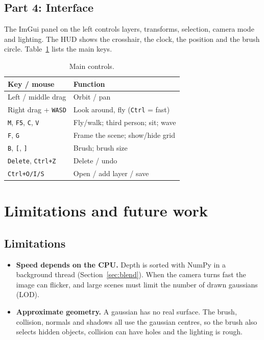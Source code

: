 \documentclass[9pt,twocolumn,a4paper]{extarticle}
\newcommand{\code}[1]{\texttt{#1}}
\begin{document}
\subsection{Part 4: Interface}
The ImGui panel on the left controls layers, transforms, selection, camera mode and lighting. The HUD shows the crosshair, the clock, the position and the brush circle. Table~\ref{tab:keys} lists the main keys.
\begin{table}[H]
\centering
\caption{Main controls.}
\label{tab:keys}
\footnotesize
\begin{tabular}{@{}p{3.1cm}p{4.6cm}@{}}
\toprule
Key / mouse & Function \\
\midrule
Left / middle drag & Orbit / pan \\
Right drag + \code{WASD} & Look around, fly (\code{Ctrl} = fast) \\
\code{M}, \code{F5}, \code{C}, \code{V} & Fly/walk; third person; sit; wave \\
\code{F}, \code{G} & Frame the scene; show/hide grid \\
\code{B}, \code{[}, \code{]} & Brush; brush size \\
\code{Delete}, \code{Ctrl+Z} & Delete / undo \\
\code{Ctrl+O/I/S} & Open / add layer / save \\
\bottomrule
\end{tabular}
\end{table}

\section{Limitations and future work}
\label{chap:future}
\subsection{Limitations}
\begin{itemize}\itemsep0pt
\item \textbf{Speed depends on the CPU.} Depth is sorted with NumPy in a background thread (Section~\ref{sec:blend}). When the camera turns fast the image can flicker, and large scenes must limit the number of drawn gaussians (LOD).
\item \textbf{Approximate geometry.} A gaussian has no real surface. The brush, collision, normals and shadows all use the gaussian centres, so the brush also selects hidden objects, collision can have holes and the lighting is rough.
\end{itemize}
\end{document}
